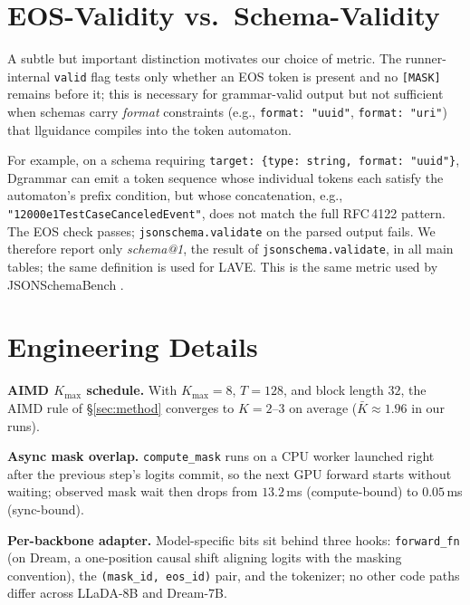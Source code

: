 \documentclass[11pt]{article}
\begin{document}
\section{EOS-Validity vs.\ Schema-Validity}
\label{app:format}
\label{app:eos-validity}

A subtle but important distinction motivates our choice of metric. The runner-internal \texttt{valid} flag tests only whether an EOS token is present and no \texttt{[MASK]} remains before it; this is necessary for grammar-valid output but not sufficient when schemas carry \emph{format} constraints (e.g., \texttt{format:\,"uuid"}, \texttt{format:\,"uri"}) that llguidance compiles into the token automaton.

For example, on a schema requiring \texttt{target:\,\{type:\,string,\,format:\,"uuid"\}}, Dgrammar can emit a token sequence whose individual tokens each satisfy the automaton's prefix condition, but whose concatenation, e.g., \texttt{"12000e1TestCaseCanceledEvent"}, does not match the full RFC\,4122 pattern. The EOS check passes; \texttt{jsonschema.validate} on the parsed output fails. We therefore report only \emph{schema@1}, the result of \texttt{jsonschema.validate}, in all main tables; the same definition is used for LAVE. This is the same metric used by JSONSchemaBench \citep{jsonschemabench2025}.

\section{Engineering Details}
\label{app:engineering}

\textbf{AIMD $K_{\max}$ schedule.} With $K_{\max}{=}8$, $T{=}128$, and block length $32$, the AIMD rule of \S\ref{sec:method} converges to $K{=}2$--$3$ on average ($\bar K\!\approx\!1.96$ in our runs).

\textbf{Async mask overlap.} \texttt{compute\_mask} runs on a CPU worker launched right after the previous step's logits commit, so the next GPU forward starts without waiting; observed mask wait then drops from $13.2$\,ms (compute-bound) to $0.05$\,ms (sync-bound).

\textbf{Per-backbone adapter.} Model-specific bits sit behind three hooks: \texttt{forward\_fn} (on Dream, a one-position causal shift aligning logits with the masking convention), the \texttt{(mask\_id, eos\_id)} pair, and the tokenizer; no other code paths differ across LLaDA-8B and Dream-7B.
\end{document}
